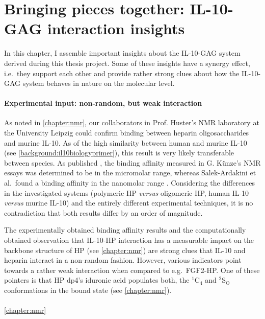 \chapter{Bringing pieces together: IL-10-GAG interaction insights}

In this chapter, I assemble important insights about the IL-10-GAG system
derived during this thesis project. Some of these insights have a synergy
effect, i.e.\ they support each other and provide rather strong clues about how
the IL-10-GAG system behaves in nature on the molecular level.


\subsubsection{Experimental input: non-random, but weak interaction}

As noted in \cref{chapter:nmr}, our collaborators in Prof. Huster's NMR
laboratory at the University Leipzig could confirm binding between heparin
oligosaccharides and murine IL-10. As of the high similarity between human and
murine IL-10 (see \cref{background:il10biologyprimer}), this result is very
likely transferable between species. As published \cite{kuenze_gehrcke_2014},
the binding affinity measured in G. Künze's NMR essays was determined to be in
the micromolar range, whereas Salek-Ardakini et al.\ found a binding affinity in
the nanomolar range \cite{salek_ardakani_2000}. Considering the differences in
the investigated systems (polymeric HP \textit{versus} oligomeric HP, human
IL-10 \textit{versus} murine IL-10) and the entirely different experimental
techniques, it is no contradiction that both results differ by an order of
magnitude.

The experimentally obtained binding affinity results and the computationally
obtained observation that IL-10-HP interaction has a measurable impact on the
backbone structure of HP (see \cref{chapter:nmr}) are strong clues that IL-10
and heparin interact in a non-random fashion. However, various indicators point
towards a rather weak interaction when compared to e.g.\ FGF2-HP. One of these
pointers is that HP dp4's iduronic acid populates both, the ${}^1$C${}_4$ and
${}^2$S${}_\mathrm{O}$ conformations in the bound state (see
\cref{chapter:nmr}).


\subsubsection{}


\cref{chapter:nmr}


